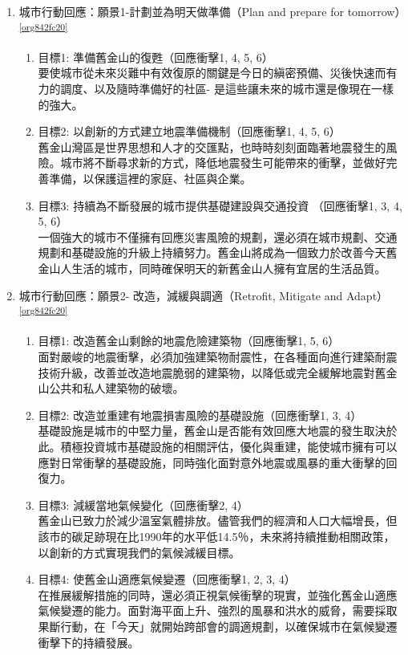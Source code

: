 \documentclass[a4paper,12pt]{article}
\begin{document}
\begin{enumerate}
\item 城市行動回應：願景1-計劃並為明天做準備（Plan and prepare for tomorrow）\textsuperscript{\ref{org842fc20}}
\label{sec:org83637f7}
\begin{enumerate}
\item 目標1: 準備舊金山的復甦（回應衝擊1, 4, 5, 6）\\
要使城市從未來災難中有效復原的關鍵是今日的縝密預備、災後快速而有力的調度、以及隨時準備好的社區- 是這些讓未來的城市還是像現在一樣的強大。\\
\item 目標2: 以創新的方式建立地震準備機制（回應衝擊1, 4, 5, 6）\\
舊金山灣區是世界思想和人才的交匯點，也時時刻刻面臨著地震發生的風險。城市將不斷尋求新的方式，降低地震發生可能帶來的衝擊，並做好完善準備，以保護這裡的家庭、社區與企業。\\
\item 目標3: 持續為不斷發展的城市提供基礎建設與交通投資 （回應衝擊1, 3, 4, 5, 6）\\
一個強大的城市不僅擁有回應災害風險的規劃，還必須在城市規劃、交通規劃和基礎設施的升級上持續努力。舊金山將成為一個致力於改善今天舊金山人生活的城市，同時確保明天的新舊金山人擁有宜居的生活品質。\\
\end{enumerate}

\item 城市行動回應：願景2- 改造，減緩與調適（Retrofit, Mitigate and Adapt）\textsuperscript{\ref{org842fc20}}
\label{sec:orge0ff8a2}
\begin{enumerate}
\item 目標1: 改造舊金山剩餘的地震危險建築物（回應衝擊1, 5, 6）\\
面對嚴峻的地震衝擊，必須加強建築物耐震性，在各種面向進行建築耐震技術升級，改善並改造地震脆弱的建築物，以降低或完全緩解地震對舊金山公共和私人建築物的破壞。\\
\item 目標2: 改造並重建有地震損害風險的基礎設施（回應衝擊1, 3, 4）\\
基礎設施是城市的中堅力量，舊金山是否能有效回應大地震的發生取決於此。積極投資城市基礎設施的相關評估，優化與重建，能使城市擁有可以應對日常衝擊的基礎設施，同時強化面對意外地震或風暴的重大衝擊的回復力。\\
\item 目標3: 減緩當地氣候變化（回應衝擊2, 4）\\
舊金山已致力於減少溫室氣體排放。儘管我們的經濟和人口大幅增長，但該市的碳足跡現在比1990年的水平低14.5％，未來將持續推動相關政策，以創新的方式實現我們的氣候減緩目標。\\
\item 目標4: 使舊金山適應氣候變遷（回應衝擊1, 2, 3, 4）\\
在推展緩解措施的同時，還必須正視氣候衝擊的現實，並強化舊金山適應氣候變遷的能力。面對海平面上升、強烈的風暴和洪水的威脅，需要採取果斷行動，在「今天」就開始跨部會的調適規劃，以確保城市在氣候變遷衝擊下的持續發展。\\
\end{enumerate}


\end{enumerate}
\end{document}
